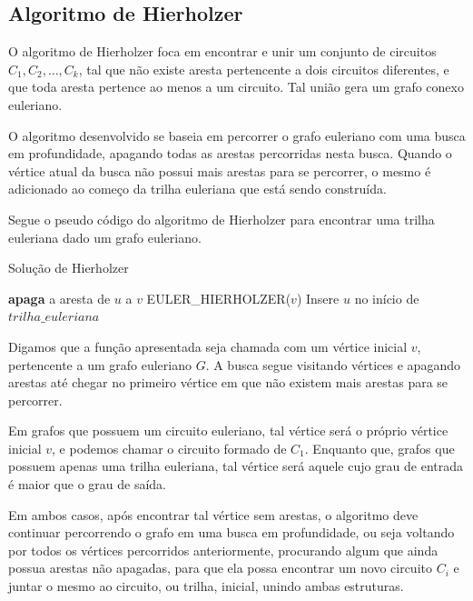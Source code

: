 \documentclass[12pt, a4paper]{article}
\begin{document}


\subsection{Algoritmo de Hierholzer}

O algoritmo de Hierholzer foca em encontrar e unir um conjunto de circuitos $C_1, C_2, \dots, C_k$, tal que não existe aresta pertencente a dois circuitos diferentes, e que toda aresta pertence ao menos a um circuito.
Tal união gera um grafo conexo euleriano.

O algoritmo desenvolvido se baseia em percorrer o grafo euleriano com uma busca em profundidade, apagando todas as arestas percorridas nesta busca.
Quando o vértice atual da busca não possui mais arestas para se percorrer, o mesmo é adicionado ao começo da trilha euleriana que está sendo construída.

Segue o pseudo código do algoritmo de Hierholzer para encontrar uma trilha euleriana dado um grafo euleriano.

\begin{algorithm}
\caption{Solução de Hierholzer}\label{eulerian-hierholzer}
\begin{algorithmic}[1]
    \State \textbf{apaga} a aresta de $u$ a $v$
    \State EULER\_HIERHOLZER($v$)
\EndFor
\State Insere $u$ no início de $trilha\_euleriana$
\EndFunction
\end{algorithmic}
\end{algorithm}

Digamos que a função apresentada seja chamada com um vértice inicial $v$, pertencente a um grafo euleriano $G$. A busca segue visitando vértices e apagando arestas até chegar no primeiro vértice em que não existem mais arestas para se percorrer. 

Em grafos que possuem um circuito euleriano, tal vértice será o próprio vértice inicial $v$, e podemos chamar o circuito formado de $C_1$.
Enquanto que, grafos que possuem apenas uma trilha euleriana, tal vértice será aquele cujo grau de entrada é maior que o grau de saída.

Em ambos casos, após encontrar tal vértice sem arestas, o algoritmo deve continuar percorrendo o grafo em uma busca em profundidade, ou seja voltando por todos os vértices percorridos anteriormente, procurando algum que ainda possua arestas não apagadas, para que ela possa encontrar um novo circuito $C_i$ e juntar o mesmo ao circuito, ou trilha, inicial, unindo ambas estruturas. 
\end{document}
